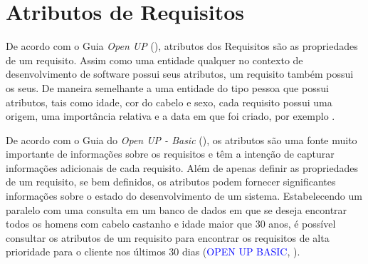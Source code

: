 \section[Atributos de Requisitos]{Atributos de Requisitos}

De acordo com o Guia \textit{Open UP} (\citeyear{openUp}), atributos dos Requisitos são as propriedades de um requisito. Assim como uma entidade qualquer no contexto de desenvolvimento de software possui seus atributos, um requisito também possui os seus. De maneira semelhante a uma entidade do tipo pessoa que possui atributos, tais como idade, cor do cabelo e sexo, cada requisito possui uma origem, uma importância relativa e a data em que foi criado, por exemplo \cite{openUpBasic}.

De acordo com o Guia do \textit{Open UP - Basic} (\citeyear{openUpBasic}), os atributos são uma fonte muito importante de informações sobre os requisitos e têm a intenção de capturar informações adicionais de cada requisito. Além de apenas definir as propriedades de um requisito, se bem definidos, os atributos podem fornecer significantes informações sobre o estado do desenvolvimento de um sistema. Estabelecendo um paralelo com uma consulta em um banco de dados em que se deseja encontrar todos os homens com cabelo castanho e idade maior que 30 anos, é possível consultar os 
atributos de um requisito para encontrar os requisitos de alta prioridade para o cliente nos últimos 30 dias (\textcolor{blue}{OPEN UP BASIC}, \citeyear{openUpBasic}).

